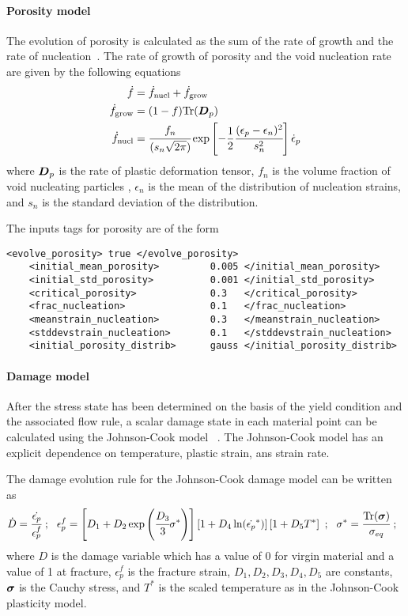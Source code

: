   \paragraph{Porosity model}
  The evolution of porosity is calculated as the sum of the rate of growth
  and the rate of nucleation~\cite{Ramaswamy98a}.  The rate of growth of
  porosity and the void nucleation rate are given by the following equations
  ~\cite{Chu80}
  \begin{align}
    \dot{f} &= \dot{f}_{\text{nucl}} + \dot{f}_{\text{grow}} \\
    \dot{f}_{\text{grow}} & = (1-f) \text{Tr}(\BD_p) \\
    \dot{f}_{\text{nucl}} & = \cfrac{f_n}{(s_n \sqrt{2\pi})}
            \exp\left[-\Half \cfrac{(\epsilon_p - \epsilon_n)^2}{s_n^2}\right]
            \dot{\epsilon}_p
  \end{align}
  where $\BD_p$ is the rate of plastic deformation tensor, $f_n$ is the volume
  fraction of void nucleating particles , $\epsilon_n$ is the mean of the
  distribution of nucleation strains, and $s_n$ is the standard
  deviation of the distribution.

  The inputs tags for porosity are of the form
  \begin{Verbatim}[fontsize=\footnotesize]
    <evolve_porosity> true </evolve_porosity>
    <initial_mean_porosity>         0.005 </initial_mean_porosity>
    <initial_std_porosity>          0.001 </initial_std_porosity>
    <critical_porosity>             0.3   </critical_porosity>
    <frac_nucleation>               0.1   </frac_nucleation>
    <meanstrain_nucleation>         0.3   </meanstrain_nucleation>
    <stddevstrain_nucleation>       0.1   </stddevstrain_nucleation>
    <initial_porosity_distrib>      gauss </initial_porosity_distrib>
  \end{Verbatim}

  \paragraph{Damage model}
  After the stress state has been determined on the basis of the yield condition
  and the associated flow rule, a scalar damage state in each material point can
  be calculated using the Johnson-Cook model ~\cite{Johnson85}.
  The Johnson-Cook model has an explicit dependence on temperature, plastic
  strain, ans strain rate.

  The damage evolution rule for the Johnson-Cook damage model can be written as
  \begin{equation}
    \dot{D} = \cfrac{\dot{\epsilon_p}}{\epsilon_p^f} ~;~~
    \epsilon_p^f = 
      \left[D_1 + D_2 \exp \left(\cfrac{D_3}{3} \sigma^*\right)\right]
      \left[1+ D_4 \ln(\dot{\epsilon_p}^*)\right]
      \left[1+D_5 T^*\right]~;~~
    \sigma^*= \cfrac{\text{Tr}(\Bsig)}{\sigma_{eq}}~;~~
  \end{equation}
  where $D$ is the damage variable which has a value of 0 for virgin material
  and a value of 1 at fracture, $\epsilon_p^f$ is the fracture strain,
  $D_1, D_2, D_3, D_4, D_5$ are constants, $\Bsig$ is the Cauchy stress, and
  $T^*$ is the scaled temperature as in the Johnson-Cook plasticity model.

